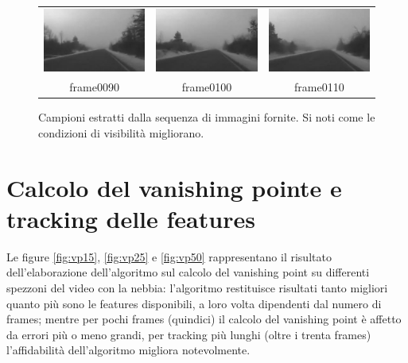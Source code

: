 \documentclass[12pt]{report}
\begin{document}
\begin{figure}[H]
\begin{tabular}{ccc}
	\includegraphics[scale=\videoScale]{images/frame0090.jpg} & \includegraphics[scale=\videoScale]{images/frame0100.jpg} & \includegraphics[scale=\videoScale]{images/frame0110.jpg}\\
	frame0090 & frame0100 & frame0110 \\
\end{tabular}
\caption{Campioni estratti dalla sequenza di immagini fornite. Si noti come le condizioni di visibilit\`a migliorano.}
\label{fig:video}
\end{figure}

\section{Calcolo del vanishing pointe e tracking delle features}

\noindent Le figure \ref{fig:vp15}, \ref{fig:vp25} e \ref{fig:vp50} rappresentano il risultato dell'elaborazione dell'algoritmo sul calcolo del vanishing point su differenti spezzoni del video con la nebbia: l'algoritmo restituisce risultati tanto migliori quanto pi\`u sono le features disponibili, a loro volta dipendenti dal numero di frames; mentre per pochi frames (quindici) il calcolo del vanishing point \`e affetto da errori pi\`u o meno grandi, per tracking pi\`u lunghi (oltre i trenta frames) l'affidabilit\`a dell'algoritmo migliora notevolmente.\\
\end{document}
